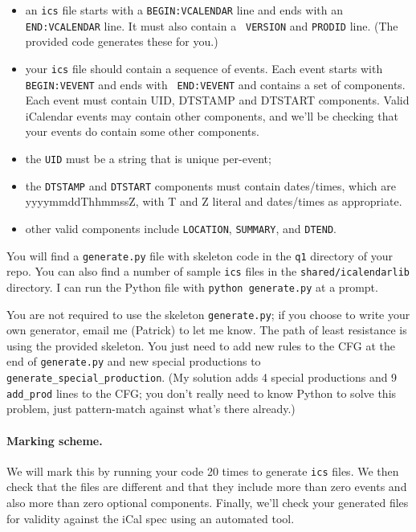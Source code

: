 \documentclass[10pt,hidelinks]{article}
\begin{document}
\begin{itemize}
  \item an {\tt ics} file starts with a {\tt BEGIN:VCALENDAR} line and
    ends with an {\tt END:VCALENDAR} line. It must also contain a {\tt
      VERSION} and {\tt PRODID} line. (The provided code generates
    these for you.)
  \item your {\tt ics} file should contain a sequence of events.  Each
    event starts with {\tt BEGIN:VEVENT} and ends with {\tt
      END:VEVENT} and contains a set of components.  Each event must
    contain UID, DTSTAMP and DTSTART components. Valid iCalendar
    events may contain other components, and we'll be checking that
    your events do contain some other components.
  \item the {\tt UID} must be a string that is unique per-event;
  \item the {\tt DTSTAMP} and {\tt DTSTART} components must contain dates/times, which are
    yyyymmddThhmmssZ, with T and Z literal and dates/times as appropriate.
  \item other valid components include {\tt LOCATION}, {\tt SUMMARY}, and {\tt DTEND}.
\end{itemize}

You will find a {\tt generate.py} file with skeleton code in the {\tt q1} directory of your repo.
You can also find a number of sample {\tt ics} files in the {\tt shared/icalendarlib} directory.
I can run the Python file with {\tt python generate.py} at a prompt.

You are not required to use the skeleton {\tt generate.py}; if you choose to write your own
generator, email me (Patrick) to let me know. The path of least resistance is
using the provided skeleton. You just need to add new rules to the CFG at the end of {\tt generate.py}
and new special productions to {\tt generate\_special\_production}. (My solution adds 4
special productions and 9 {\tt add\_prod} lines to the CFG; you don't really need to know
Python to solve this problem, just pattern-match against what's there already.)

\paragraph{Marking scheme.} We will mark this by running your code 20 times to generate
          {\tt ics} files. We then check that the files are different and that they include more
          than zero events and also more than zero optional components. Finally, we'll check
          your generated files for validity against the iCal spec using an automated tool.
\end{document}
